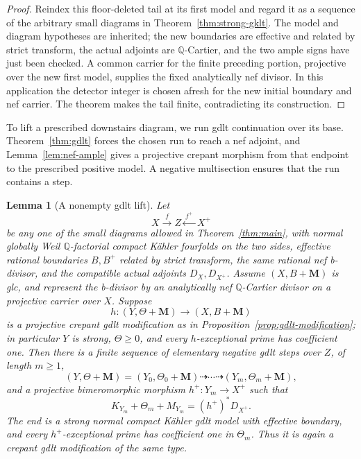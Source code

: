 \documentclass[11pt]{amsart}
\newtheorem{lemma}[theorem]{Lemma}
\theoremstyle{definition}
\theoremstyle{remark}
\numberwithin{equation}{section}
\newcommand{\Q}{\mathbb{Q}}
\newcommand{\M}{\mathbf{M}}
\begin{document}
\begin{proof}
Reindex this floor-deleted tail at its first model and regard it as a
sequence of the arbitrary small diagrams in Theorem~\ref{thm:strong-gklt}.
The model and diagram hypotheses are inherited; the new boundaries are
effective and related by strict transform, the actual adjoints are
\(\Q\)-Cartier, and the two ample signs have just been checked.  A common
carrier for the finite preceding portion, projective over the new first
model, supplies the fixed analytically nef divisor.  In this application
the detector integer is chosen afresh for the new initial boundary and
nef carrier.  The theorem makes the tail finite, contradicting its
construction.
\end{proof}

To lift a prescribed downstairs diagram, we run gdlt continuation over
its base.  Theorem~\ref{thm:gdlt} forces the chosen run to reach a nef
adjoint, and Lemma~\ref{lem:nef-ample} gives a projective crepant morphism
from that endpoint to the prescribed positive model.  A negative
multisection ensures that the run contains a step.

\begin{lemma}[A nonempty gdlt lift]\label{lem:nonempty-lift}
Let
\[
 X\xrightarrow{\ f\ }Z\xleftarrow{\ f^+\ }X^+
\]
be any one of the small diagrams allowed in Theorem~\ref{thm:main}, with
normal globally Weil \(\Q\)-factorial compact K\"ahler fourfolds on the two
sides, effective rational boundaries \(B,B^+\) related by strict transform,
the same rational nef b-divisor, and the compatible actual adjoints
\(D_X,D_{X^+}\).  Assume \((X,B+\M)\) is glc, and represent the b-divisor
by an analytically nef \(\Q\)-Cartier divisor on a projective carrier over
\(X\).  Suppose
\[
 h:(Y,\Theta+\M)\longrightarrow(X,B+\M)
\]
is a projective crepant gdlt modification as in
Proposition~\ref{prop:gdlt-modification}; in particular \(Y\) is strong,
\(\Theta\geq0\), and every \(h\)-exceptional prime has coefficient one.
Then there is a finite sequence of elementary negative gdlt steps over
\(Z\), of length \(m\geq1\),
\[
 (Y,\Theta+\M)=(Y_0,\Theta_0+\M)
 \dashrightarrow\cdots\dashrightarrow(Y_m,\Theta_m+\M),
\]
and a projective bimeromorphic morphism \(h^+:Y_m\to X^+\) such that
\[
 K_{Y_m}+\Theta_m+M_{Y_m}=(h^+)^*D_{X^+}.
\]
The end is a strong normal compact K\"ahler gdlt model with effective
boundary, and every \(h^+\)-exceptional prime has coefficient one in
\(\Theta_m\).  Thus it is again a crepant gdlt modification of the same
type.
\end{lemma}
\end{document}
